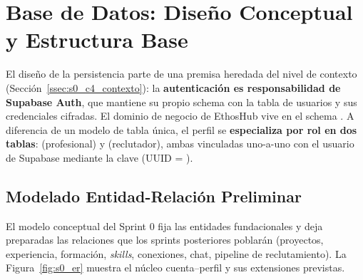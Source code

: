 \section{Base de Datos: Diseño Conceptual y Estructura Base}
\label{sec:s0_database}

El diseño de la persistencia parte de una premisa heredada del nivel de contexto
(Sección~\ref{ssec:s0_c4_contexto}): la \textbf{autenticación es responsabilidad de Supabase
Auth}, que mantiene su propio schema  con la tabla de usuarios y sus credenciales
cifradas. El dominio de negocio de EthosHub vive en el schema . A diferencia de un
modelo de tabla única, el perfil se \textbf{especializa por rol en dos tablas}:
 (profesional) y  (reclutador),
ambas vinculadas uno-a-uno con el usuario de Supabase mediante la clave 
(UUID = ).\par

\subsection{Modelado Entidad-Relación Preliminar}
\label{ssec:s0_er_preliminar}

El modelo conceptual del Sprint 0 fija las entidades fundacionales y deja preparadas las
relaciones que los sprints posteriores poblarán (proyectos, experiencia, formación,
\textit{skills}, conexiones, chat, pipeline de reclutamiento). La Figura~\ref{fig:s0_er} muestra
el núcleo cuenta--perfil y sus extensiones previstas.

